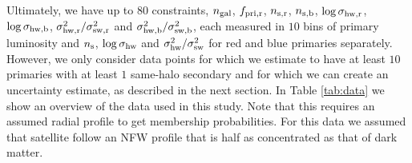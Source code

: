 \documentclass[fleqn,usenatbib,useAMS]{mnras}
\begin{document}
Ultimately, we have up to $80$ constraints, $n_{\rm gal}$, $f_{\rm pri, r}$, $n_{\rm s, r}$, $n_{\rm s, b}$, $\log \sigma_{\rm hw, r}$, $\log \sigma_{\rm hw, b}$, $\sigma_{\rm hw, r}^2 / \sigma_{\rm sw, r}^2$ and $\sigma_{\rm hw, b}^2 / \sigma_{\rm sw, b}^2$, each measured in $10$ bins of primary luminosity and $n_{\rm s}$, $\log \sigma_{\rm hw}$ and $\sigma_{\rm hw}^2 / \sigma_{\rm sw}^2$ for red and blue primaries separately. However, we only consider data points for which we estimate to have at least $10$ primaries with at least $1$ same-halo secondary and for which we can create an uncertainty estimate, as described in the next section. In Table \ref{tab:data} we show an overview of the data used in this study. Note that this requires an assumed radial profile to get membership probabilities. For this data we assumed that satellite follow an NFW profile that is half as concentrated as that of dark matter.
\end{document}
